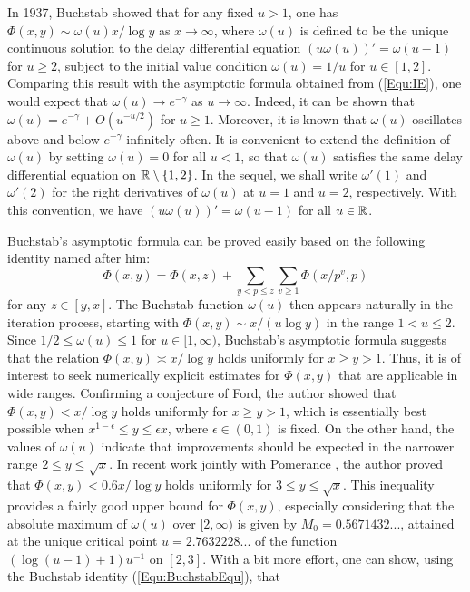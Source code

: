\documentclass[12pt,reqno]{amsart}
\begin{document}

In 1937, Buchstab \cite{Bu} showed that for any fixed $u>1$, one has $\Phi(x,y)\sim \omega(u)x/\log y$ as $x\to\infty$, where $\omega(u)$ is defined to be the unique continuous solution to the delay differential equation $(u\omega(u))'=\omega(u-1)$ for $u\ge2$, subject to the initial value condition $\omega(u)=1/u$ for $u\in[1,2]$. Comparing this result with the asymptotic formula obtained from (\ref{Equ:IE}), one would expect that $\omega(u)\to e^{-\gamma}$ as $u\to\infty$. Indeed, it can be shown \cite[Corollary III.6.5]{T} that $\omega(u)=e^{-\gamma}+O(u^{-u/2})$ for $u\ge1$. Moreover, it is known that $\omega(u)$ oscillates above and below $e^{-\gamma}$ infinitely often. It is convenient to extend the definition of $\omega(u)$ by setting $\omega(u)=0$ for all $u<1$, so that $\omega(u)$ satisfies the same delay differential equation on $\mathbb R\setminus\{1,2\}$. In the sequel, we shall write $\omega'(1)$ and $\omega'(2)$ for the right derivatives of $\omega(u)$ at $u=1$ and $u=2$, respectively. With this convention, we have $(u\omega(u))'=\omega(u-1)$ for all $u\in\mathbb R$.
\par Buchstab's asymptotic formula can be proved easily based on the following identity \cite[Theorem III.6.3]{T} named after him:
\begin{equation}\label{Equ:BuchstabEqu}
\Phi(x,y)=\Phi(x,z)+\sum_{y<p\le z}\sum_{v\ge1}\Phi(x/p^{v},p)
\end{equation}
for any $z\in[y,x]$. The Buchstab function $\omega(u)$ then appears naturally in the iteration process, starting with $\Phi(x,y)\sim x/(u\log y)$ in the range $1< u\le 2$. Since $1/2\le\omega(u)\le1$ for $u\in[1,\infty)$, Buchstab's asymptotic formula suggests that the relation $\Phi(x,y) \asymp x/\log y$ holds uniformly for $x\ge y>1$. Thus, it is of interest to seek numerically explicit estimates for $\Phi(x,y)$ that are applicable in wide ranges. Confirming a conjecture of Ford, the author \cite{F} showed that $\Phi(x,y)<x/\log y$ holds uniformly for $x\ge y>1$, which is essentially best possible when $x^{1-\epsilon}\le y\le \epsilon x$, where $\epsilon\in(0,1)$ is fixed. On the other hand, the values of $\omega(u)$ indicate that improvements should be expected in the narrower range $2\le y\le\sqrt{x}$. In recent work jointly with Pomerance \cite{FP}, the author proved that $\Phi(x,y)<0.6x/\log y$ holds uniformly for $3\le y\le\sqrt{x}$. This inequality provides a fairly good upper bound for $\Phi(x,y)$, especially considering that the absolute maximum of $\omega(u)$ over $[2,\infty)$ is given by $M_0=0.5671432...$, attained at the unique critical point $u=2.7632228...$ of the function $(\log(u-1)+1)u^{-1}$ on $[2,3]$. With a bit more effort, one can show, using the Buchstab identity (\ref{Equ:BuchstabEqu}), that
\end{document}

